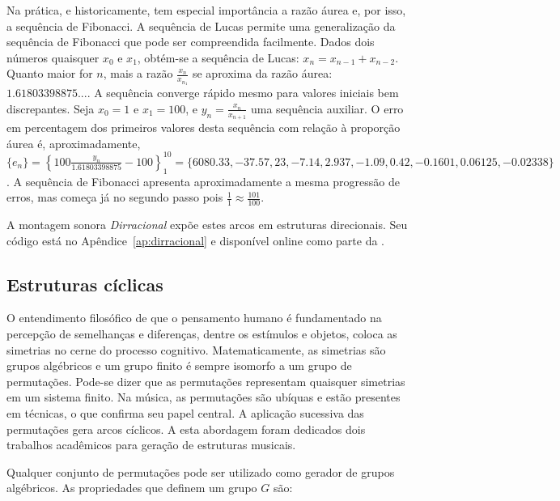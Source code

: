 Na prática, e historicamente, tem especial importância a razão áurea e, por isso, a sequência de Fibonacci. A sequência de Lucas permite uma generalização da sequência de Fibonacci que pode ser compreendida facilmente. Dados dois números quaisquer $x_0$ e $x_1$, obtém-se a sequência de Lucas: $x_n=x_{n-1}+x_{n-2}$. Quanto maior for $n$, mais a razão $\frac{x_{n}}{x_{n_1}}$ se aproxima da razão áurea: $1.61803398875...$. A sequência converge rápido mesmo para valores iniciais bem discrepantes. Seja $x_0=1$ e $x_1=100$, e $y_n=\frac{x_n}{x_{n+1}}$ uma sequência auxiliar. O erro em percentagem dos primeiros valores desta sequência com relação à proporção áurea é, aproximadamente, $\{ e_n \} =\left\{100\frac{y_n}{1.61803398875}-100 \right\}_1^{10}=\{6080.33, -37.57, 23, -7.14, 2.937, -1.09, 0.42, -0.1601, 0.06125, -0.02338\}$. A sequência de Fibonacci apresenta aproximadamente a mesma progressão de erros, mas começa já no segundo passo pois $\frac{1}{1}\approx\frac{101}{100}$.

A montagem sonora \emph{Dirracional} expõe estes arcos em estruturas direcionais. Seu código está no Apêndice~\ref{ap:dirracional} e disponível online como parte da \massa.\cite{MASSA}

\subsection{Estruturas cíclicas}\label{estCic}

O entendimento filosófico de que o pensamento humano é fundamentado
na percepção de semelhanças e diferenças, dentre os estímulos
e objetos, coloca
as simetrias no cerne do processo cognitivo.\cite{Deleuze}
Matematicamente,
as simetrias são grupos algébricos e um grupo finito
é sempre isomorfo a um grupo de permutações. 
Pode-se dizer que
as permutações representam quaisquer simetrias em um sistema finito.
Na música, as permutações são ubíquas
e estão presentes em técnicas, o que confirma seu papel central.
A aplicação sucessiva das permutações gera arcos cíclicos.\cite{change,Zamacois,permMusic}
A esta abordagem foram dedicados dois trabalhos acadêmicos para geração de estruturas musicais.\cite{figgusOriginal, figgusEspacializacao}

Qualquer conjunto de permutações pode ser utilizado como gerador de grupos algébricos.\cite{permMusic} As propriedades que definem um grupo $G$ são:

